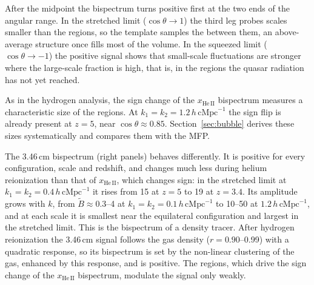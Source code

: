 After the midpoint the bispectrum turns positive first at the two ends of the angular range. In the stretched limit ($\cos\theta \to 1$) the third leg probes scales smaller than the  regions, so the template samples the  between them, an above-average structure once  fills most of the volume. In the squeezed limit ($\cos\theta \to -1$) the positive signal shows that small-scale  fluctuations are stronger where the large-scale  fraction is high, that is, in the regions the quasar radiation has not yet reached.

As in the hydrogen analysis, the sign change of the $x_\mathrm{He\,II}$ bispectrum measures a characteristic size of the  regions. At $k_1 = k_2 = 1.2\,h\,\mathrm{cMpc}^{-1}$ the sign flip is already present at $z = 5$, near $\cos\theta \approx 0.85$. Section~\ref{sec:bubble} derives these sizes systematically and compares them with the MFP.

The 3.46\,cm bispectrum (right panels) behaves differently. It is positive for every configuration, scale and redshift, and changes much less during helium reionization than that of $x_\mathrm{He\,II}$, which changes sign: in the stretched limit at $k_1 = k_2 = 0.4\,h\,\mathrm{cMpc}^{-1}$ it rises from 15 at $z = 5$ to 19 at $z = 3.4$. Its amplitude grows with $k$, from $\tilde{B} \approx 0.3$--4 at $k_1 = k_2 = 0.1\,h\,\mathrm{cMpc}^{-1}$ to 10--50 at $1.2\,h\,\mathrm{cMpc}^{-1}$, and at each scale it is smallest near the equilateral configuration and largest in the stretched limit. This is the bispectrum of a density tracer. After hydrogen reionization the 3.46\,cm signal follows the gas density ($r = 0.90$--0.99) with a quadratic response, so its bispectrum is set by the non-linear clustering of the gas, enhanced by this response, and is positive. The  regions, which drive the sign change of the $x_\mathrm{He\,II}$ bispectrum, modulate the signal only weakly.



    \caption{Redshift evolution of the non-isosceles bispectrum $\tilde{B}_\mathrm{non\text{-}iso}(k_1, k_2, \theta)$ for the singly ionized helium fraction $x_\mathrm{He\,II}$ (left panel) and the 3.46\,cm brightness temperature $\delta T_\mathrm{b}^\mathrm{He}$ (right panel, gas-cell maps), evaluated at the fixed configuration $k_1 = k_2/2 = 0.3\,h\,\mathrm{cMpc}^{-1}$. Colors and dashed curve follow the same convention as Figure~\ref{fig:bispec_He_iso}. The right panel uses a linear scale. The vertical dashed line marks the configuration at $\cos\theta = -0.5$.}


